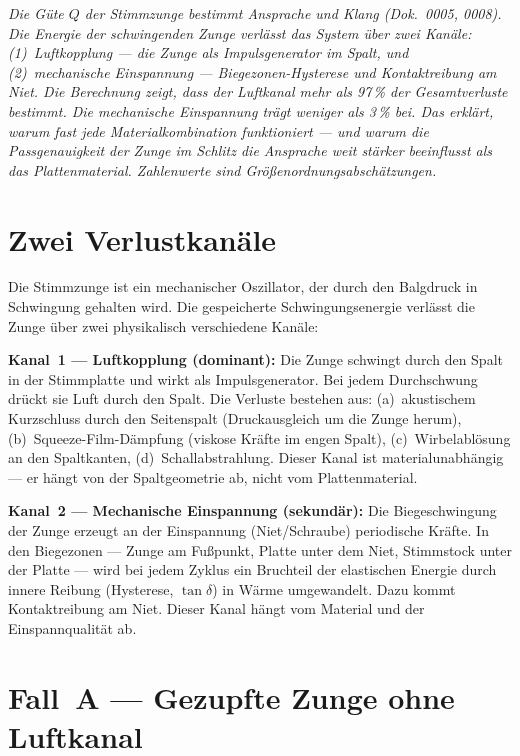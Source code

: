\documentclass[11pt,a4paper]{article}
\begin{document}
\hbmaketitle

{\small\itshape Die Güte $Q$ der Stimmzunge bestimmt Ansprache und Klang (Dok.~0005, 0008). Die Energie der schwingenden Zunge verlässt das System über zwei Kanäle: (1)~Luftkopplung --- die Zunge als Impulsgenerator im Spalt, und (2)~mechanische Einspannung --- Biegezonen-Hysterese und Kontaktreibung am Niet. Die Berechnung zeigt, dass der Luftkanal mehr als 97\,\% der Gesamtverluste bestimmt. Die mechanische Einspannung trägt weniger als 3\,\% bei. Das erklärt, warum fast jede Materialkombination funktioniert --- und warum die Passgenauigkeit der Zunge im Schlitz die Ansprache weit stärker beeinflusst als das Plattenmaterial. Zahlenwerte sind Größenordnungsabschätzungen.}

\vspace{4mm}

\section{Zwei Verlustkanäle}

Die Stimmzunge ist ein mechanischer Oszillator, der durch den Balgdruck in Schwingung gehalten wird. Die gespeicherte Schwingungsenergie verlässt die Zunge über zwei physikalisch verschiedene Kanäle:

\textbf{Kanal~1 --- Luftkopplung (dominant):} Die Zunge schwingt durch den Spalt in der Stimmplatte und wirkt als Impulsgenerator. Bei jedem Durchschwung drückt sie Luft durch den Spalt. Die Verluste bestehen aus: (a)~akustischem Kurzschluss durch den Seitenspalt (Druckausgleich um die Zunge herum), (b)~Squeeze-Film-Dämpfung (viskose Kräfte im engen Spalt), (c)~Wirbelablösung an den Spaltkanten, (d)~Schallabstrahlung. Dieser Kanal ist materialunabhängig --- er hängt von der Spaltgeometrie ab, nicht vom Plattenmaterial.

\textbf{Kanal~2 --- Mechanische Einspannung (sekundär):} Die Biegeschwingung der Zunge erzeugt an der Einspannung (Niet/Schraube) periodische Kräfte. In den Biegezonen --- Zunge am Fußpunkt, Platte unter dem Niet, Stimmstock unter der Platte --- wird bei jedem Zyklus ein Bruchteil der elastischen Energie durch innere Reibung (Hysterese, $\tan\delta$) in Wärme umgewandelt. Dazu kommt Kontaktreibung am Niet. Dieser Kanal hängt vom Material und der Einspannqualität ab.

\section{Fall~A --- Gezupfte Zunge ohne Luftkanal}
\end{document}
